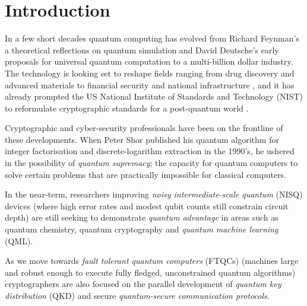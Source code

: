 \section{Introduction}




In a few short decades quantum computing has evolved from Richard Feynman's a theoretical reflections on quantum simulation 
\cite{Feynman:1986} and David Deutsche's early proposals for universal quantum computation \cite{Deutsch:1985} 
to a multi-billion dollar industry\cite{QuantumConsortium:2025}.
The technology is looking set to reshape fields ranging from drug discovery and advanced materials 
to financial security and national infrastructure \cite{Google:Applications},
and it has already prompted the US National Institute of Standards and Technology (NIST) to reformulate cryptographic standards for a post-quantum world \cite{NIST:2022}. 

Cryptographic and cyber-security professionals have been on the frontline of these developments.
When Peter Shor published his quantum algorithm for integer factorisation and discrete-logarithm extraction in the 1990's\cite{Shor:1997},
he ushered in the possibility of \emph{quantum supremacy};
the capacity for quantum computers to solve certain problems that are practically impossible for classical computers.

In the near-term, researchers improving \emph{noisy intermediate-scale quantum} (NISQ) devices 
(where high error rates and modest qubit counts still constrain circuit depth) 
are still seeking to demonstrate \emph{quantum advantage} in areas such as quantum chemistry, 
quantum cryptography and \emph{quantum machine learning} (QML).   

As we move towards \emph{fault tolerant quantum computers} (FTQCs)
(machines large and robust enough to execute fully fledged, unconstrained quantum algorithms)
cryptographers are also focused on the parallel development of \emph{quantum key distribution} (QKD) 
and secure \emph{quantum-secure communication protocols}.

